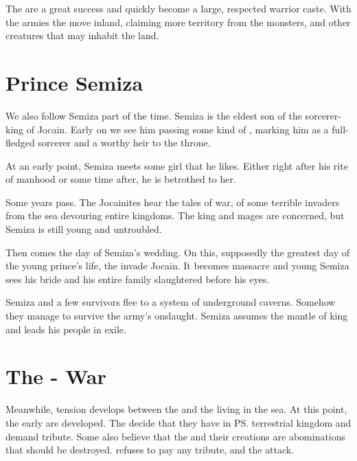 The \cregorr{} are a great success and quickly become a large, respected warrior caste. With the \cregorr{} armies the \dragons{} move inland, claiming more territory from the monsters, \nephilim{} and other creatures that may inhabit the land. 








\section{Prince Semiza}
We also follow Semiza part of the time. 
Semiza is the eldest son of the \nephil{} sorcerer-king of Jocain. 
Early on we see him passing some kind of , marking him as a full-fledged sorcerer and a worthy heir to the throne. 

At an early point, Semiza meets some girl that he likes. 
Either right after his rite of manhood or some time after, he is betrothed to her. 

Some years pass. 
The Jocainites hear the tales of war, of some terrible invaders from the sea devouring entire kingdoms. 
The king and mages are concerned, but Semiza is still young and untroubled. 

Then comes the day of Semiza's wedding. 
On this, supposedly the greatest day of the young prince's life, the \dragons{} invade Jocain. 
It becomes massacre and young Semiza sees his bride and his entire family slaughtered before his eyes. 

Semiza and a few survivors flee to a system of underground caverns. 
Somehow they manage to survive the \draconic{} army's onslaught. 
Semiza assumes the mantle of king and leads his people in exile. 







\section{The \Dragon{}-\Leviathan{} War}
Meanwhile, tension develops between the \dragons{} and the \leviathans{} living in the sea. At this point, the early \scathae{} are developed. The \leviathans{} decide that they have  in \ps{\HesodN}{} terrestrial kingdom and demand tribute. Some \leviathans{} also believe that the \dragons{} and their creations are abominations that should be destroyed. \HesodN{} refuses to pay any tribute, and the \leviathans{} attack. 


